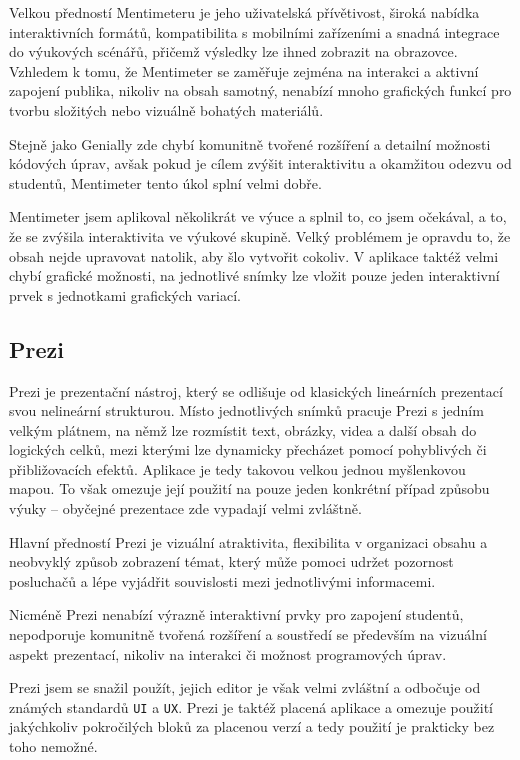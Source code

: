 Velkou předností Mentimeteru je jeho uživatelská přívětivost, široká nabídka interaktivních formátů, kompatibilita s mobilními zařízeními a snadná integrace do výukových scénářů, přičemž výsledky lze ihned zobrazit na obrazovce. 
Vzhledem k tomu, že Mentimeter se zaměřuje zejména na interakci a aktivní zapojení publika, nikoliv na obsah samotný, nenabízí mnoho grafických funkcí pro tvorbu složitých nebo vizuálně bohatých materiálů. 

Stejně jako Genially zde chybí komunitně tvořené rozšíření a detailní možnosti kódových úprav, avšak pokud je cílem zvýšit interaktivitu a okamžitou odezvu od studentů, Mentimeter tento úkol splní velmi dobře.

Mentimeter jsem aplikoval několikrát ve výuce a splnil to, co jsem očekával, a to, že se zvýšila interaktivita ve výukové skupině. 
Velký problémem je opravdu to, že obsah nejde upravovat natolik, aby šlo vytvořit cokoliv. 
V aplikace taktéž velmi chybí grafické možnosti, na jednotlivé snímky lze vložit pouze jeden interaktivní prvek s jednotkami grafických variací.

\subsection{Prezi}

Prezi je prezentační nástroj, který se odlišuje od klasických lineárních prezentací svou nelineární strukturou.
Místo jednotlivých snímků pracuje Prezi s jedním velkým plátnem, na němž lze rozmístit text, obrázky, videa a další obsah do logických celků, mezi kterými lze dynamicky přecházet pomocí pohyblivých či přibližovacích efektů.
Aplikace je tedy takovou velkou jednou myšlenkovou mapou.
To však omezuje její použití na pouze jeden konkrétní případ způsobu výuky -- obyčejné prezentace zde vypadají velmi zvláštně.

Hlavní předností Prezi je vizuální atraktivita, flexibilita v organizaci obsahu a neobvyklý způsob zobrazení témat, který může pomoci udržet pozornost posluchačů a lépe vyjádřit souvislosti mezi jednotlivými informacemi. 

Nicméně Prezi nenabízí výrazně interaktivní prvky pro zapojení studentů, nepodporuje komunitně tvořená rozšíření a soustředí se především na vizuální aspekt prezentací, nikoliv na interakci či možnost programových úprav.

Prezi jsem se snažil použít, jejich editor je však velmi zvláštní a odbočuje od známých standardů \texttt{UI} a \texttt{UX}.
Prezi je taktéž placená aplikace a omezuje použití jakýchkoliv pokročilých bloků za placenou verzí a tedy použití je prakticky bez toho nemožné.

